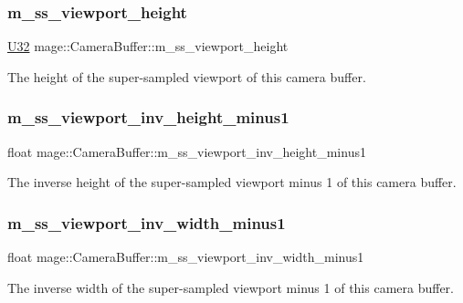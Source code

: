 \subsubsection{\texorpdfstring{m\+\_\+ss\+\_\+viewport\+\_\+height}{m\_ss\_viewport\_height}}
{\footnotesize\ttfamily \hyperlink{namespacemage_a41c104c036fba3756a74e19f793eeaa1}{U32} mage\+::\+Camera\+Buffer\+::m\+\_\+ss\+\_\+viewport\+\_\+height}

The height of the super-\/sampled viewport of this camera buffer. \hypertarget{structmage_1_1_camera_buffer_a6aa695ae5bfa64139e104df95a6f844e}{}\label{structmage_1_1_camera_buffer_a6aa695ae5bfa64139e104df95a6f844e} 
\subsubsection{\texorpdfstring{m\+\_\+ss\+\_\+viewport\+\_\+inv\+\_\+height\+\_\+minus1}{m\_ss\_viewport\_inv\_height\_minus1}}
{\footnotesize\ttfamily float mage\+::\+Camera\+Buffer\+::m\+\_\+ss\+\_\+viewport\+\_\+inv\+\_\+height\+\_\+minus1}

The inverse height of the super-\/sampled viewport minus 1 of this camera buffer. \hypertarget{structmage_1_1_camera_buffer_a4e400cc708de607778c71aec784b30ce}{}\label{structmage_1_1_camera_buffer_a4e400cc708de607778c71aec784b30ce} 
\subsubsection{\texorpdfstring{m\+\_\+ss\+\_\+viewport\+\_\+inv\+\_\+width\+\_\+minus1}{m\_ss\_viewport\_inv\_width\_minus1}}
{\footnotesize\ttfamily float mage\+::\+Camera\+Buffer\+::m\+\_\+ss\+\_\+viewport\+\_\+inv\+\_\+width\+\_\+minus1}

The inverse width of the super-\/sampled viewport minus 1 of this camera buffer. \hypertarget{structmage_1_1_camera_buffer_a0584c712968ff83e6b22fa0ad83e0da5}{}\label{structmage_1_1_camera_buffer_a0584c712968ff83e6b22fa0ad83e0da5} 
